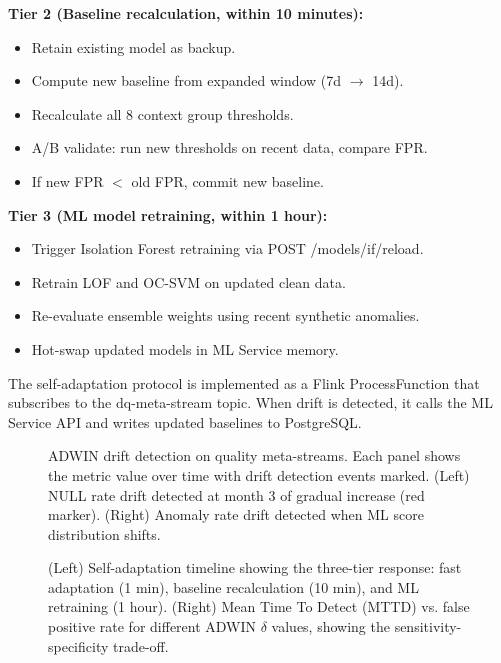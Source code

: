 \textbf{Tier 2 (Baseline recalculation, within 10 minutes):}
\begin{itemize}
    \item Retain existing model as backup.
    \item Compute new baseline from expanded window (7d $\to$ 14d).
    \item Recalculate all 8 context group thresholds.
    \item A/B validate: run new thresholds on recent data, compare FPR.
    \item If new FPR $<$ old FPR, commit new baseline.
\end{itemize}

\textbf{Tier 3 (ML model retraining, within 1 hour):}
\begin{itemize}
    \item Trigger Isolation Forest retraining via POST /models/if/reload.
    \item Retrain LOF and OC-SVM on updated clean data.
    \item Re-evaluate ensemble weights using recent synthetic anomalies.
    \item Hot-swap updated models in ML Service memory.
\end{itemize}

The self-adaptation protocol is implemented as a Flink ProcessFunction that subscribes to the dq-meta-stream topic. When drift is detected, it calls the ML Service API and writes updated baselines to PostgreSQL.

\begin{figure}[H]
\centering
{}
\caption{ADWIN drift detection on quality meta-streams. Each panel shows the metric value over time with drift detection events marked. (Left) NULL rate drift detected at month 3 of gradual increase (red marker). (Right) Anomaly rate drift detected when ML score distribution shifts.}
\end{figure}

\begin{figure}[H]
\centering
{}
\caption{(Left) Self-adaptation timeline showing the three-tier response: fast adaptation (1 min), baseline recalculation (10 min), and ML retraining (1 hour). (Right) Mean Time To Detect (MTTD) vs. false positive rate for different ADWIN $\delta$ values, showing the sensitivity-specificity trade-off.}
\end{figure}


